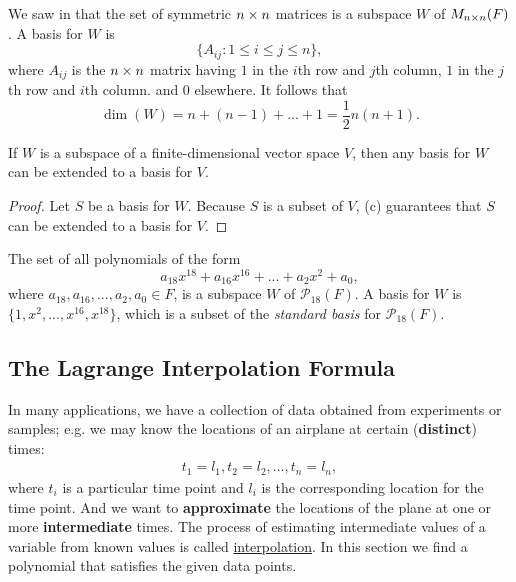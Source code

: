 \begin{example} \label{example 1.6.20}
We saw in  that the set of symmetric \(n \times n\) matrices is a subspace \(W\) of \(M_{n \times n}(F)\).
A basis for \(W\) is
\[
    \{ A_{ij} : 1 \le i \le j \le n \},
\]
where \(A_{ij}\) is the \(n \times n\) matrix having \(1\) in the \(i\)th row and \(j\)th column, \(1\) in the \(j\)th row and \(i\)th column. and \(0\) elsewhere.
It follows that
\[
    \dim(W) = n + (n - 1) + ... + 1 = \frac{1}{2}n(n + 1). 
\]
\end{example}

\begin{corollary} \label{corollary 1.11.1}
If \(W\) is a subspace of a finite-dimensional vector space \(V\), then any basis for \(W\) can be extended to a basis for \(V\).
\end{corollary}

\begin{proof}
Let \(S\) be a basis for \(W\).
Because \(S\) is a \LID{} subset of \(V\), (c) guarantees that \(S\) can be extended to a basis for \(V\).
\end{proof}

\begin{example} \label{example 1.6.21}
The set of all polynomials of the form
\[
    a_{18} x^{18} + a_{16} x^{16} + ... + a_2 x^2 + a_0,
\]
where \(a_{18}, a_{16}, ..., a_2, a_0 \in F\), is a subspace \(W\) of \(\mathcal{P}_{18}(F)\).
A basis for \(W\) is \(\{ 1, x^2, ..., x^{16}, x^{18} \}\), which is a subset of the \emph{standard basis} for \(\mathcal{P}_{18}(F)\).
\end{example}

\subsection{The Lagrange Interpolation Formula}
In many applications, we have a collection of data obtained from experiments or samples;
e.g. we may know the locations of an airplane at certain (\textbf{distinct}) times:
\begin{align*}
    t_1 = l_1,
    t_2 = l_2,
    ...,
    t_n = l_n,
\end{align*}
where \(t_i\) is a particular time point and \(l_i\) is the corresponding location for the time point.
And we want to \textbf{approximate} the locations of the plane at one or more \textbf{intermediate} times.
The process of estimating intermediate values of a variable from known values is called \href{https://www.wikiwand.com/en/Interpolation}{interpolation}.
In this section we find a polynomial that satisfies the given data points.

